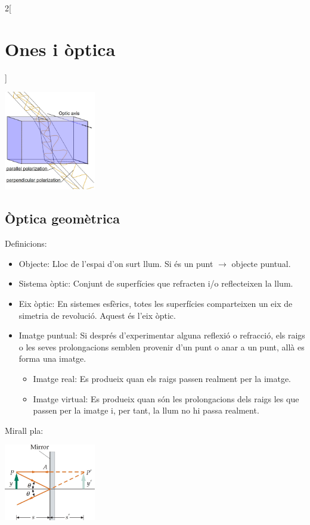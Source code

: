 \documentclass[../../../main.tex]{subfiles}
\begin{document}
\begin{multicols}{2}[\section{Ones i òptica}]
\begin{itemize}
\begin{minipage}{\linewidth}
            \centering
            \includegraphics[width=4cm]{Physics/1st/Waves_and_optics/Images/dif.jpg}
            \label{bir}
          \end{minipage}
  \end{itemize}
  \subsection{Òptica geomètrica}
  Definicions:
  \begin{itemize}
    \item Objecte: Lloc de l'espai d'on surt llum. Si és un punt $\rightarrow$ objecte puntual.
    \item Sistema òptic: Conjunt de superfícies que refracten i/o reflecteixen la llum.
    \item Eix òptic: En sistemes esfèrics, totes les superfícies comparteixen un eix de simetria de revolució. Aquest és l'eix òptic.
    \item Imatge puntual: Si després d'ex\-pe\-ri\-men\-tar alguna reflexió o refracció, els raigs o les seves prolongacions semblen provenir d'un punt o anar a un punt, allà es forma una imatge.
          \begin{itemize}
            \item Imatge real: Es produeix quan els raigs passen realment per la imatge.
            \item Imatge virtual: Es produeix quan són les prolongacions dels raigs les que passen per la imatge i, per tant, la llum no hi passa realment.
          \end{itemize}
  \end{itemize}
  Mirall pla:\newline
  \begin{minipage}{\linewidth}
    \centering
    \includegraphics[width=4cm]{Physics/1st/Waves_and_optics/Images/pla.jpg}

\end{minipage}
\end{multicols}
\end{document}
